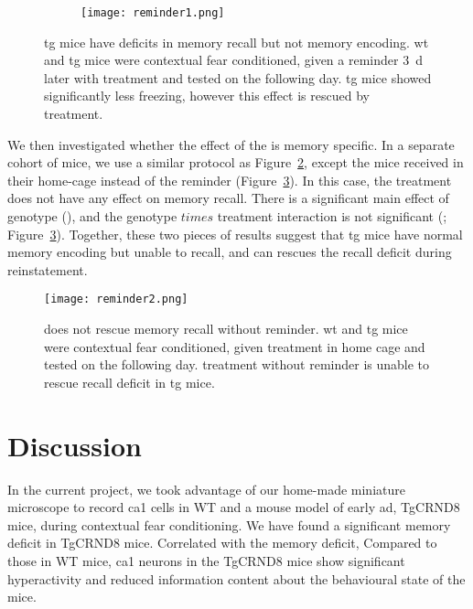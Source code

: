 \begin{figure}[h]
    \begin{subfigure}[h]{\textwidth}
        \texttt{[image: reminder1.png]}
        \caption{\label{f.ad.actf}}
    \end{subfigure}
    \caption{\gls{tg} mice have deficits in memory recall but not memory encoding. \gls{wt} and \gls{tg} mice were contextual fear conditioned, given a reminder \SI{3}{\day} later with treatment and tested on the following day. \gls{tg} mice showed significantly less freezing, however this effect is rescued by \tglu treatment. \label{f.ad.reminder1}}
\end{figure}

We then investigated whether the effect of the \tglu is memory specific. In a separate cohort of mice, we use a similar protocol as Figure~\ref{f.ad.reminder1}, except the mice received \tglu in their home-cage instead of the reminder (Figure~\ref{f.ad.reminder2}). In this case, the \tglu treatment does not have any effect on memory recall. There is a significant main effect of genotype (), and the genotype $times$ treatment interaction is not significant (; Figure~\ref{f.ad.reminder2}). Together, these two pieces of results suggest that \gls{tg} mice have normal memory encoding but unable to recall, and \tglu can rescues the recall deficit during reinstatement. 


\begin{figure}[h]
    \texttt{[image: reminder2.png]}
    \caption{\tglu does not rescue memory recall without reminder. \gls{wt} and \gls{tg} mice were contextual fear conditioned, given treatment in home cage and tested on the following day. \tglu treatment without reminder is unable to rescue recall deficit in \gls{tg} mice. \label{f.ad.reminder2}}
\end{figure}

\section{Discussion}


In the current project, we took advantage of our home-made miniature microscope to record \gls{ca1} cells in WT and a mouse model of early \gls{ad}, TgCRND8 mice, during contextual fear conditioning. We have found a significant memory deficit in TgCRND8 mice. Correlated with the memory deficit, Compared to those in WT mice, \gls{ca1} neurons in the TgCRND8 mice show significant hyperactivity and reduced information content about the behavioural state of the mice.


